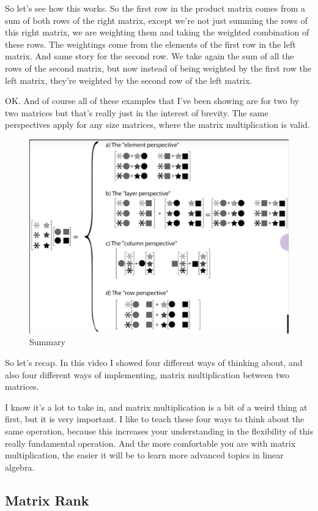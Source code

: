 \documentclass[fleqn,10pt]{olplainarticle}
\theoremstyle{definition}
\theoremstyle{remark}
\begin{document}
So let's see how this works. So the first row in the product matrix comes from a sum of both rows of the right matrix, except we're not just summing the rows of this right matrix, we are weighting them and taking the weighted combination of these rows. The weightings come from the elements of the first row in the left matrix. And same story for the second row. We take again the sum of all the rows of the second matrix, but now instead of being weighted by the first row the left matrix, they're weighted by the second row of the left matrix.

OK. And of course all of these examples that I've been showing are for two by two matrices but that's really just in the interest of brevity. The same perspectives apply for any size matrices, where the matrix multiplication is valid.

\begin{figure}[ht]
	\centering
	\includegraphics[width=0.7\linewidth]{images/multi-06.png}
	\caption{Summary}
	\label{fig:multi_06}
\end{figure}

So let's recap. In this video I showed four different ways of thinking about, and also four different ways of implementing, matrix multiplication between two matrices.

I know it's a lot to take in, and matrix multiplication is a bit of a weird thing at first, but it is very important. I like to teach these four ways to think about the same operation, because this increases your understanding in the flexibility of this really fundamental operation. And the more comfortable you are with matrix multiplication, the easier it will be to learn more advanced topics in linear algebra.

\pagebreak

\subsection*{Matrix Rank}
\end{document}
